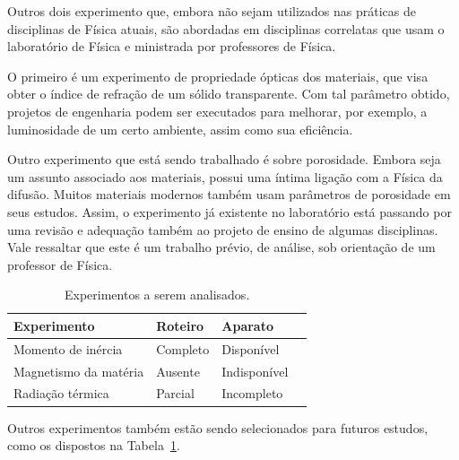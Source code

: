 \documentclass[portrait,a0]{a0poster}
\begin{document}
\begin{multicols}{2}


Outros dois experimento que, embora não sejam utilizados nas práticas de disciplinas de Física atuais, são abordadas em disciplinas correlatas que usam o laboratório de Física e ministrada por professores de Física.

O primeiro é um experimento de propriedade ópticas dos materiais, que visa obter o índice de refração de um sólido transparente.
Com tal parâmetro obtido, projetos de engenharia podem ser executados para melhorar, por exemplo, a luminosidade de um certo ambiente, assim como sua eficiência.

Outro experimento que está sendo trabalhado é sobre porosidade.
Embora seja um assunto associado aos materiais, possui uma íntima ligação com a Física da difusão.
Muitos materiais modernos também usam parâmetros de porosidade em seus estudos.
Assim, o experimento já existente no laboratório está passando por uma revisão e adequação também ao projeto de ensino de algumas disciplinas.
Vale ressaltar que este é um trabalho prévio, de análise, sob orientação de um professor de Física.

\begin{table}[H]
\centering
\begin{tabular}{l l l l}
\toprule
\textbf{Experimento} & \textbf{Roteiro} & \textbf{Aparato} \\
\midrule
Momento de inércia & Completo & Disponível \\
Magnetismo da matéria & Ausente & Indisponível \\
Radiação térmica & Parcial & Incompleto \\
\bottomrule
\end{tabular}
\caption{Experimentos a serem analisados.}
\label{tab:experimentos-futuros}
\end{table}

Outros experimentos também estão sendo selecionados para futuros estudos, como os dispostos na Tabela~\ref{tab:experimentos-futuros}.



\end{multicols}
\end{document}
